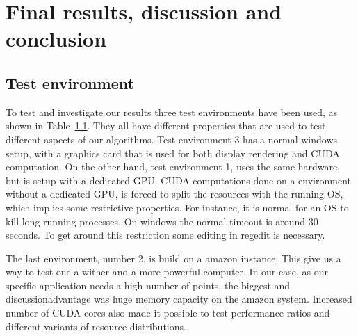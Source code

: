 
\chapter{Final results, discussion and conclusion} %
\label{sec:final_results_discussion_and_conclusion}

\section{Test environment} %
\label{sec:test_environment}

To test and investigate our results three test environments have been used, as shown in Table~\ref{sec:test_environment}. They all have different properties that are used to test different aspects of our algorithms. Test environment 3 has a normal windows setup, with a graphics card that is used for both display rendering and CUDA computation. On the other hand, test environment 1, uses the same hardware, but is setup with a dedicated GPU\@. CUDA computations done on a environment without a dedicated GPU, is forced to split the resources with the running OS, which implies some restrictive properties. For instance, it is normal for an OS to kill long running processes. On windows the normal timeout is around $30$ seconds. To get around this restriction some editing in regedit is necessary.

The last environment, number 2, is build on a amazon instance. This give us a way to test one a wither and a more powerful computer. In our case, as our specific application needs a high number of points, the biggest  and discussionadvantage was huge memory capacity on the amazon system. Increased number of CUDA cores also made it possible to test performance ratios and different variants of resource distributions.

